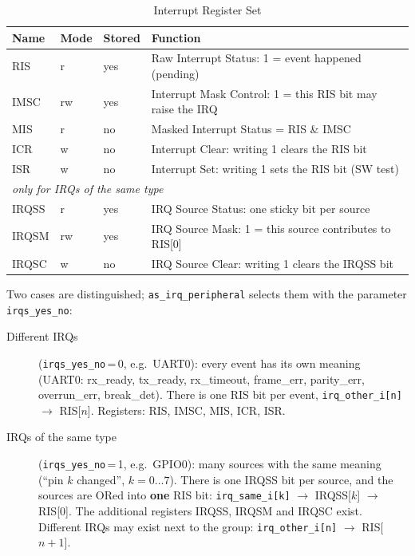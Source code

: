 \begin{table}[H]
\caption{Interrupt Register Set}
\label{tab:archirq01}
\centering
\begin{tabularx}{\textwidth}{|l|l|l|X|}
  \hline
  Name & Mode & Stored & Function \\
  \hline
  \hline
  RIS   & r  & yes & Raw Interrupt Status: 1 = event happened (pending) \\
  \hline
  IMSC  & rw & yes & Interrupt Mask Control: 1 = this RIS bit may raise the IRQ \\
  \hline
  MIS   & r  & no  & Masked Interrupt Status = RIS \& IMSC \\
  \hline
  ICR   & w  & no  & Interrupt Clear: writing 1 clears the RIS bit \\
  \hline
  ISR   & w  & no  & Interrupt Set: writing 1 sets the RIS bit (SW test) \\
  \hline
  \hline
  \multicolumn{4}{|l|}{\textit{only for IRQs of the same type}} \\
  \hline
  IRQSS & r  & yes & IRQ Source Status: one sticky bit per source \\
  \hline
  IRQSM & rw & yes & IRQ Source Mask: 1 = this source contributes to RIS[0] \\
  \hline
  IRQSC & w  & no  & IRQ Source Clear: writing 1 clears the IRQSS bit \\
  \hline
\end{tabularx}
\end{table}

Two cases are distinguished; \texttt{as\_irq\_peripheral} selects them with
the parameter \texttt{irqs\_yes\_no}:
\begin{description}
  \item[Different IRQs] (\texttt{irqs\_yes\_no}\,=\,0, e.g.\ UART0):
    every event has its own meaning (UART0: rx\_ready, tx\_ready, rx\_timeout,
    frame\_err, parity\_err, overrun\_err, break\_det). There is one RIS bit per
    event, \texttt{irq\_other\_i[n]} $\rightarrow$ RIS[$n$]. Registers: RIS,
    IMSC, MIS, ICR, ISR.
  \item[IRQs of the same type] (\texttt{irqs\_yes\_no}\,=\,1, e.g.\ GPIO0):
    many sources with the same meaning (``pin $k$ changed'', $k=0\ldots7$).
    There is one IRQSS bit per source, and the sources are ORed into
    \textbf{one} RIS bit:
    \texttt{irq\_same\_i[k]} $\rightarrow$ IRQSS[$k$] $\rightarrow$ RIS[0].
    The additional registers IRQSS, IRQSM and IRQSC exist. Different IRQs may
    exist next to the group: \texttt{irq\_other\_i[n]} $\rightarrow$ RIS[$n+1$].
\end{description}

